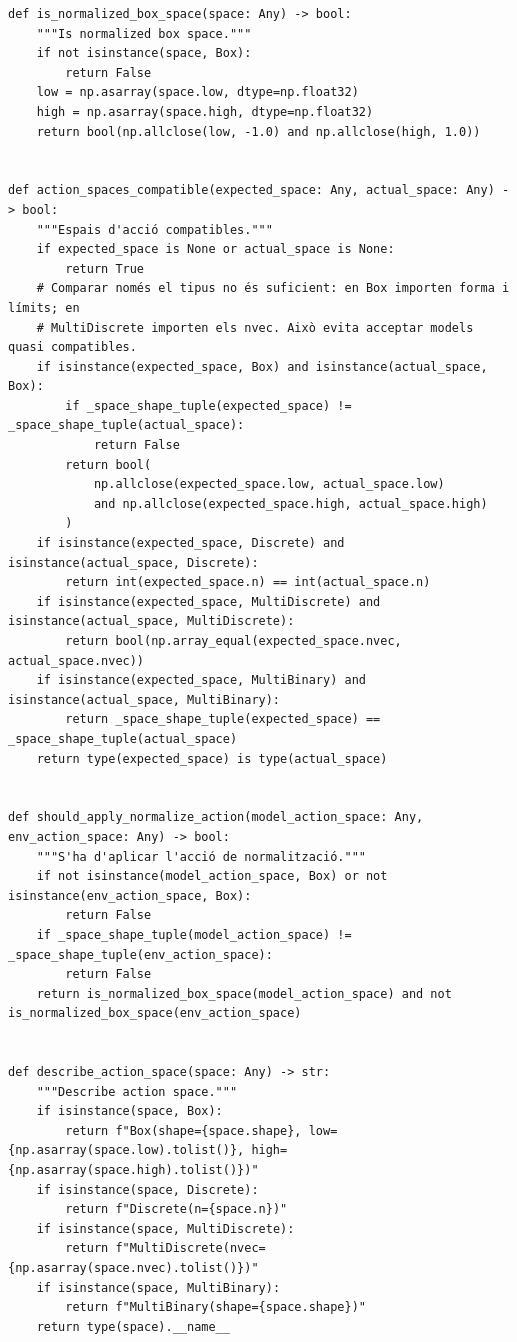 \documentclass[10pt,a4paper]{article}
\begin{document}
\begin{lstlisting}[style=studioPython,caption={backend/sb3\_utils.py},label={lst:backend-sb3-utils-py}]
def is_normalized_box_space(space: Any) -> bool:
    """Is normalized box space."""
    if not isinstance(space, Box):
        return False
    low = np.asarray(space.low, dtype=np.float32)
    high = np.asarray(space.high, dtype=np.float32)
    return bool(np.allclose(low, -1.0) and np.allclose(high, 1.0))


def action_spaces_compatible(expected_space: Any, actual_space: Any) -> bool:
    """Espais d'acció compatibles."""
    if expected_space is None or actual_space is None:
        return True
    # Comparar només el tipus no és suficient: en Box importen forma i límits; en
    # MultiDiscrete importen els nvec. Això evita acceptar models quasi compatibles.
    if isinstance(expected_space, Box) and isinstance(actual_space, Box):
        if _space_shape_tuple(expected_space) != _space_shape_tuple(actual_space):
            return False
        return bool(
            np.allclose(expected_space.low, actual_space.low)
            and np.allclose(expected_space.high, actual_space.high)
        )
    if isinstance(expected_space, Discrete) and isinstance(actual_space, Discrete):
        return int(expected_space.n) == int(actual_space.n)
    if isinstance(expected_space, MultiDiscrete) and isinstance(actual_space, MultiDiscrete):
        return bool(np.array_equal(expected_space.nvec, actual_space.nvec))
    if isinstance(expected_space, MultiBinary) and isinstance(actual_space, MultiBinary):
        return _space_shape_tuple(expected_space) == _space_shape_tuple(actual_space)
    return type(expected_space) is type(actual_space)


def should_apply_normalize_action(model_action_space: Any, env_action_space: Any) -> bool:
    """S'ha d'aplicar l'acció de normalització."""
    if not isinstance(model_action_space, Box) or not isinstance(env_action_space, Box):
        return False
    if _space_shape_tuple(model_action_space) != _space_shape_tuple(env_action_space):
        return False
    return is_normalized_box_space(model_action_space) and not is_normalized_box_space(env_action_space)


def describe_action_space(space: Any) -> str:
    """Describe action space."""
    if isinstance(space, Box):
        return f"Box(shape={space.shape}, low={np.asarray(space.low).tolist()}, high={np.asarray(space.high).tolist()})"
    if isinstance(space, Discrete):
        return f"Discrete(n={space.n})"
    if isinstance(space, MultiDiscrete):
        return f"MultiDiscrete(nvec={np.asarray(space.nvec).tolist()})"
    if isinstance(space, MultiBinary):
        return f"MultiBinary(shape={space.shape})"
    return type(space).__name__



\end{lstlisting}
\end{document}
